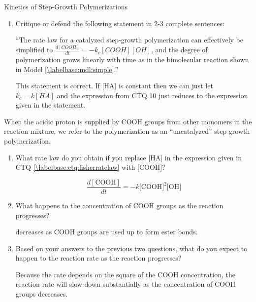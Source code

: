 \begin{activity}{Kinetics of Step-Growth Polymerizations}
\begin{ctqs}
\begin{enumerate}
			\item Critique or defend the following statement in 2-3 complete sentences:
			
				``The rate law for a catalyzed step-growth polymerization can effectively be simplified to $\frac{d[COOH]}{dt} = - k_c [COOH][OH]$, and the degree of polymerization grows linearly with time as in the bimolecular reaction shown in Model \ref{\labelbase:mdl:simple}.''
			
				\begin{solution}[1.5in]
				
				This statement is correct.  If [HA] is constant then we can just let $k_c = k[HA]$ and the expression from CTQ 10 just reduces to the expression given in the statement.
				
				\end{solution}
				
		\end{enumerate}
		
	\question When the acidic proton is supplied by COOH groups from other monomers in the reaction mixture, we refer to the polymerization as an ``uncatalyzed'' step-growth polymerization.
	
		\begin{enumerate}
				
			\item  What rate law do you obtain if you replace [HA] in the expression given in CTQ \ref{\labelbase:ctq:fisherratelaw} with [COOH]?
			
				\begin{solution}[0.75in]	
					\begin{equation*}
						\frac{d[\text{COOH}]}{dt} = - k \text{[COOH]}^2\text{[OH]}
					\end{equation*}
				\end{solution}
		
			\item What happens to the concentration of COOH groups as the reaction progresses?
			
				\begin{solution}[0.75in]	
					[COOH] decreases as COOH groups are used up to form ester bonds.
				\end{solution}
			
			\item Based on your answers to the previous two questions, what do you expect to happen to the reaction rate as the reaction progresses?
			
				\begin{solution}[0.75in]	
					Because the rate depends on the square of the COOH concentration, the reaction rate will slow down substantially as the concentration of COOH groups decreases.
				\end{solution}
			

\end{enumerate}
\end{ctqs}
\end{activity}
